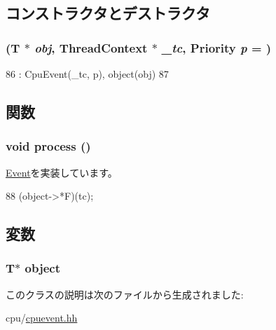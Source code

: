 \subsection{コンストラクタとデストラクタ}
\hypertarget{classCpuEventWrapper_a55c80848dbb951563535d623e2201472}{
\subsubsection[{CpuEventWrapper}]{ (T $\ast$ {\em obj}, \/  {\bf ThreadContext} $\ast$ {\em \_\-tc}, \/  {\bf Priority} {\em p} = {})}}
\label{classCpuEventWrapper_a55c80848dbb951563535d623e2201472}



\begin{DoxyCode}
86         : CpuEvent(_tc, p), object(obj)
87     { }
\end{DoxyCode}


\subsection{関数}
\hypertarget{classCpuEventWrapper_a2e9c5136d19b1a95fc427e0852deab5c}{
\subsubsection[{process}]{\setlength{\rightskip}{0pt plus 5cm}void process ()}}
\label{classCpuEventWrapper_a2e9c5136d19b1a95fc427e0852deab5c}


\hyperlink{classEvent_a142b75b68a6291400e20fb0dd905b1c8}{Event}を実装しています。


\begin{DoxyCode}
88 { (object->*F)(tc); }
\end{DoxyCode}


\subsection{変数}
\hypertarget{classCpuEventWrapper_acd5a12b9b1a75e37fd605accfe038a03}{
\subsubsection[{object}]{\setlength{\rightskip}{0pt plus 5cm}T$\ast$ {\bf object}}}
\label{classCpuEventWrapper_acd5a12b9b1a75e37fd605accfe038a03}


このクラスの説明は次のファイルから生成されました:\begin{DoxyCompactItemize}
\item 
cpu/\hyperlink{cpuevent_8hh}{cpuevent.hh}\end{DoxyCompactItemize}
